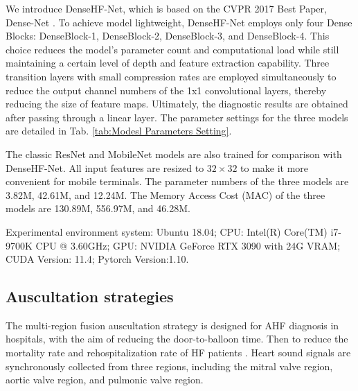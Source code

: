 We introduce DenseHF-Net, which is based on the CVPR 2017 Best Paper, Dense-Net \cite{huang2017densely}. 
To achieve model lightweight, DenseHF-Net employs only four Dense Blocks: DenseBlock-1, DenseBlock-2, DenseBlock-3, and DenseBlock-4. This choice reduces the model's parameter count and computational load while still maintaining a certain level of depth and feature extraction capability. Three transition layers with small compression rates are employed simultaneously to reduce the output channel numbers of the 1x1 convolutional layers, thereby reducing the size of feature maps. Ultimately, the diagnostic results are obtained after passing through a linear layer. The parameter settings for the three models are detailed in Tab. \ref{tab:Modesl Parameters Setting}.

The classic ResNet \cite{he2016deep} and MobileNet \cite{howard2017mobilenets} models are also trained for comparison with DenseHF-Net. All input features are resized to $32\times32$ to make it more convenient for mobile terminals. The parameter numbers of the three models are 3.82M, 42.61M, and 12.24M. The Memory Access Cost (MAC) of the three models are 130.89M, 556.97M, and 46.28M.

Experimental environment system: Ubuntu 18.04; CPU: Intel(R) Core(TM) i7-9700K CPU @ 3.60GHz; GPU: NVIDIA GeForce RTX 3090 with 24G VRAM; CUDA Version: 11.4; Pytorch Version:1.10.
\subsection{Auscultation strategies}
The multi-region fusion auscultation strategy is designed for AHF diagnosis in hospitals, with the aim of reducing the door-to-balloon time. Then to reduce the mortality rate and rehospitalization rate of HF patients \cite{fan2021effects}. Heart sound signals are synchronously collected from three regions, including the mitral valve region, aortic valve region, and pulmonic valve region.

